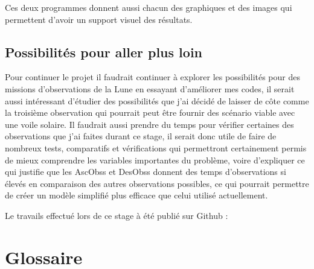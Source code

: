 \documentclass[11pt]{article} %
\begin{document}
		Ces deux programmes donnent aussi chacun des graphiques et des images qui permettent d'avoir un support visuel des résultats.
		
		\subsection{Possibilités pour aller plus loin}
		Pour continuer le projet il faudrait continuer à explorer les possibilités pour des missions d'observations de la Lune en essayant d'améliorer mes codes, il serait aussi intéressant d'étudier des possibilités que j'ai décidé de laisser de côte comme la troisième observation qui pourrait peut être fournir des scénario viable avec une voile solaire. Il faudrait aussi prendre du temps pour vérifier certaines des observations que j'ai faites durant ce stage, il serait donc utile de faire de nombreux tests, comparatifs et vérifications qui permettront certainement permis de mieux comprendre les variables importantes du problème, voire d'expliquer ce qui justifie que les \glspl{AscObs} et \glspl{DesObs} donnent des temps d'observations si élevés en comparaison des autres observations possibles, ce qui pourrait permettre de créer un modèle simplifié plus efficace que celui utilisé actuellement.
		
		Le travails effectué lors de ce stage à été publié sur Github : 
		\vfill
		
		\section{Glossaire}
		
		\printglossaries
		
		
\end{document}
